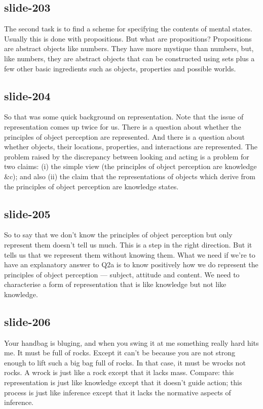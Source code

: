 \documentclass[12pt,\papersize]{extarticle}
\begin{document}
 
\subsection{slide-203}
The second task is to find a scheme for specifying the contents of mental states.
Usually this is done with propositions.
But what are propositions?
Propositions are abstract objects like numbers.
They have more mystique than numbers, but, like numbers, they are abstract objects that can be constructed using sets plus a few other basic ingredients such as objects, properties and possible worlds.
 
 
\subsection{slide-204}
So that was some quick background on representation.
Note that the issue of representation comes up twice for us.
There is a question about whether the principles of object perception are represented.
And there is a question about whether objects, their locations, properties, and interactions are represented.
The problem raised by the discrepancy between looking and acting is a problem for two claims: (i) the simple view (the principles of object perception are knowledge \&c); and also (ii) the claim that the representations of objects which derive from the principles of object perception are knowledge states.
 
 
\subsection{slide-205}
So to say that we don't know the principles of object perception but only represent them doesn't tell us much. This is a step in the right direction. But it tells us that we represent them without knowing them.
What we need if we're to have an explanatory answer to Q2a is to know positively how we do represent the principles of object perception --- subject, attitude and content. We need to characterise a form of representation that is like knowledge but not like knowledge.
 
 
\subsection{slide-206}
Your handbag is bluging, and when you swing it at me something really hard hits me.
It must be full of rocks.
Except it can't be because you are not strong enough to lift such a big bag full of rocks.
In that case, it must be wrocks not rocks.
A wrock is just like a rock except that it lacks mass.
Compare: this representation is just like knowledge except that it doesn't guide action; this process is just like inference except that it lacks the normative aspects of inference.
 
\end{document}

